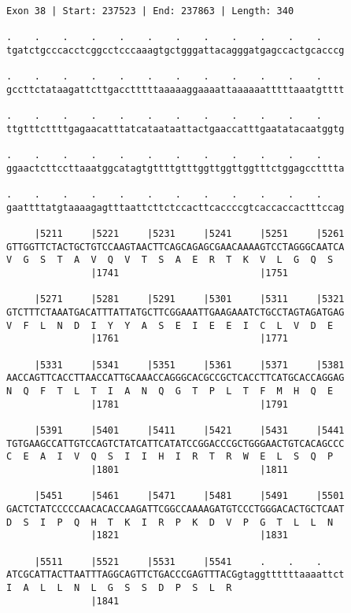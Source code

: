 \documentclass{article}
\begin{document}
\begin{Verbatim}
Exon 38 | Start: 237523 | End: 237863 | Length: 340
 
.    .    .    .    .    .    .    .    .    .    .    .    
tgatctgcccacctcggcctcccaaagtgctgggattacagggatgagccactgcacccg
  
.    .    .    .    .    .    .    .    .    .    .    .    
gccttctataagattcttgacctttttaaaaaggaaaattaaaaaatttttaaatgtttt
  
.    .    .    .    .    .    .    .    .    .    .    .    
ttgtttcttttgagaacatttatcataataattactgaaccatttgaatatacaatggtg
  
.    .    .    .    .    .    .    .    .    .    .    .    
ggaactcttccttaaatggcatagtgttttgtttggttggttggtttctggagcctttta
  
.    .    .    .    .    .    .    .    .    .    .    .    
gaattttatgtaaaagagtttaattcttctccacttcaccccgtcaccaccactttccag
  
     |5211     |5221     |5231     |5241     |5251     |5261
GTTGGTTCTACTGCTGTCCAAGTAACTTCAGCAGAGCGAACAAAAGTCCTAGGGCAATCA
V  G  S  T  A  V  Q  V  T  S  A  E  R  T  K  V  L  G  Q  S  
               |1741                         |1751          
  
     |5271     |5281     |5291     |5301     |5311     |5321
GTCTTTCTAAATGACATTTATTATGCTTCGGAAATTGAAGAAATCTGCCTAGTAGATGAG
V  F  L  N  D  I  Y  Y  A  S  E  I  E  E  I  C  L  V  D  E  
               |1761                         |1771          
  
     |5331     |5341     |5351     |5361     |5371     |5381
AACCAGTTCACCTTAACCATTGCAAACCAGGGCACGCCGCTCACCTTCATGCACCAGGAG
N  Q  F  T  L  T  I  A  N  Q  G  T  P  L  T  F  M  H  Q  E  
               |1781                         |1791          
  
     |5391     |5401     |5411     |5421     |5431     |5441
TGTGAAGCCATTGTCCAGTCTATCATTCATATCCGGACCCGCTGGGAACTGTCACAGCCC
C  E  A  I  V  Q  S  I  I  H  I  R  T  R  W  E  L  S  Q  P  
               |1801                         |1811          
  
     |5451     |5461     |5471     |5481     |5491     |5501
GACTCTATCCCCCAACACACCAAGATTCGGCCAAAAGATGTCCCTGGGACACTGCTCAAT
D  S  I  P  Q  H  T  K  I  R  P  K  D  V  P  G  T  L  L  N  
               |1821                         |1831          
  
     |5511     |5521     |5531     |5541     .    .    .    
ATCGCATTACTTAATTTAGGCAGTTCTGACCCGAGTTTACGgtaggttttttaaaattct
I  A  L  L  N  L  G  S  S  D  P  S  L  R                    
               |1841                                        
  

\end{Verbatim}
\end{document}
